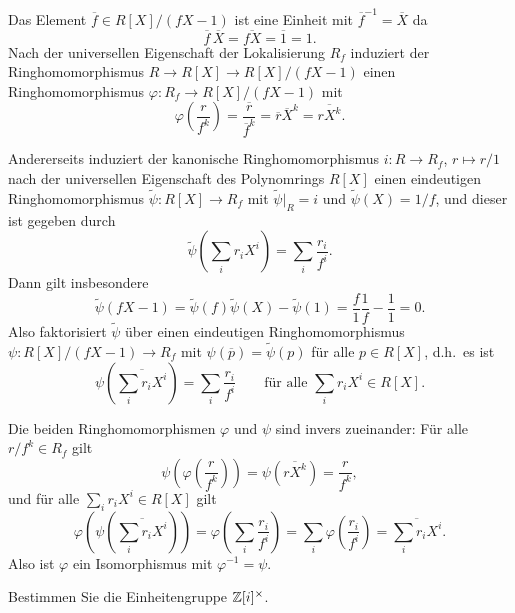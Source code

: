 \begin{solution}
  Das Element $\overline{f} \in R[X]/(fX-1)$ ist eine Einheit mit $\overline{f}^{-1} = \overline{X}$ da
  \[
      \overline{f} \, \overline{X}
    = \overline{fX}
    = \overline{1}
    = 1.
  \]
  Nach der universellen Eigenschaft der Lokalisierung $R_f$ induziert der Ringhomomorphismus $R \to R[X] \to R[X]/(fX-1)$ einen Ringhomomorphismus $\varphi \colon R_f \to R[X]/(fX-1)$ mit
  \[
      \varphi\left( \frac{r}{f^k} \right)
    = \frac{\overline{r}}{\overline{f}^k}
    = \overline{r} \overline{X}^k
    = \overline{r X^k}.
  \]
  
  Andererseits induziert der kanonische Ringhomomorphismus $i \colon R \to R_f$, $r \mapsto r/1$ nach der universellen Eigenschaft des Polynomrings $R[X]$ einen eindeutigen Ringhomomorphismus $\tilde{\psi} \colon R[X] \to R_f$ mit $\tilde{\psi}|_R = i$ und $\tilde{\psi}(X) = 1/f$, und dieser ist gegeben durch
  \[
      \tilde{\psi}\left( \sum_i r_i X^i \right)
    = \sum_i \frac{r_i}{f^i}.
  \]
  Dann gilt insbesondere
  \[
      \tilde{\psi}(fX-1)
    = \tilde{\psi}(f) \tilde{\psi}(X) - \tilde{\psi}(1)
    = \frac{f}{1} \frac{1}{f} - \frac{1}{1}
    = 0.
  \]
  Also faktorisiert $\tilde{\psi}$ über einen eindeutigen Ringhomomorphismus $\psi \colon R[X]/(fX-1) \to R_f$ mit $\psi(\overline{p}) = \tilde{\psi}(p)$ für alle $p \in R[X]$, d.h.\ es ist
  \[
      \psi\left( \overline{ \sum_i r_i X^i } \right)
    = \sum_i \frac{r_i}{f^i}
    \qquad
    \text{für alle $\sum_i r_i X^i \in R[X]$}.
  \]
  
  Die beiden Ringhomomorphismen $\varphi$ und $\psi$ sind invers zueinander:
  Für alle $r/f^k \in R_f$ gilt
  \[
      \psi\left( \varphi\left( \frac{r}{f^k} \right) \right)
    = \psi\left( \overline{r X^k} \right)
    = \frac{r}{f^k},
  \]
  und für alle $\sum_i r_i X^i \in R[X]$ gilt
  \[
      \varphi\left( \psi\left( \overline{\sum_i r_i X^i} \right) \right)
    = \varphi\left( \sum_i \frac{r_i}{f^i} \right)
    = \sum_i \varphi\left( \frac{r_i}{f^i} \right)
    = \overline{\sum_i r_i X^i}.
  \]
  Also ist $\varphi$ ein Isomorphismus mit $\varphi^{-1} = \psi$.
\end{solution}


\begin{question}
  Bestimmen Sie die Einheitengruppe $\mathbb{Z}[i]^\times$.
\end{question}


